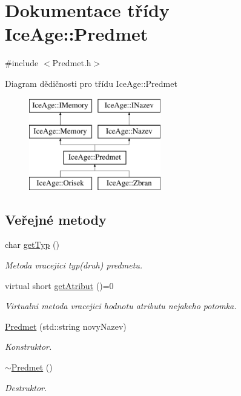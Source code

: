 \hypertarget{classIceAge_1_1Predmet}{}\section{Dokumentace třídy Ice\+Age\+:\+:Predmet}
\label{classIceAge_1_1Predmet}


{\ttfamily \#include $<$Predmet.\+h$>$}

Diagram dědičnosti pro třídu Ice\+Age\+:\+:Predmet\begin{figure}[H]
\begin{center}
\leavevmode
\includegraphics[height=4.000000cm]{db/db8/classIceAge_1_1Predmet}
\end{center}
\end{figure}
\subsection*{Veřejné metody}
\begin{DoxyCompactItemize}
\item 
char \hyperlink{classIceAge_1_1Predmet_a90491592ba559e5b276b672633795e29}{get\+Typ} ()
\begin{DoxyCompactList}\small\item\em Metoda vracejici typ(druh) predmetu. \end{DoxyCompactList}\item 
virtual short \hyperlink{classIceAge_1_1Predmet_a43f6c212f4c86e970c3b44eee829a1e1}{get\+Atribut} ()=0
\begin{DoxyCompactList}\small\item\em Virtualni metoda vracejici hodnotu atributu nejakeho potomka. \end{DoxyCompactList}\item 
\hyperlink{classIceAge_1_1Predmet_a9926e099eb9fa9e7b0e6dbc57c70da8c}{Predmet} (std\+::string novy\+Nazev)
\begin{DoxyCompactList}\small\item\em Konstruktor. \end{DoxyCompactList}\item 
\hyperlink{classIceAge_1_1Predmet_a5d1df42cff0edd79e2a3990535ae86da}{$\sim$\+Predmet} ()
\begin{DoxyCompactList}\small\item\em Destruktor. \end{DoxyCompactList}\end{DoxyCompactItemize}

